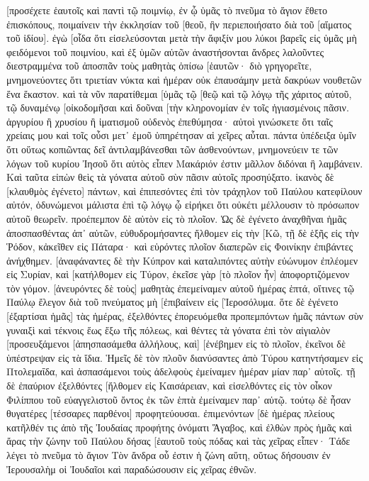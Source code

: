 [προσέχετε ἑαυτοῖς καὶ παντὶ τῷ ποιμνίῳ, ἐν ᾧ ὑμᾶς τὸ πνεῦμα τὸ ἅγιον ἔθετο ἐπισκόπους, ποιμαίνειν τὴν ἐκκλησίαν τοῦ [θεοῦ, ἣν περιεποιήσατο διὰ τοῦ [αἵματος τοῦ ἰδίου]. 
ἐγὼ [οἶδα ὅτι εἰσελεύσονται μετὰ τὴν ἄφιξίν μου λύκοι βαρεῖς εἰς ὑμᾶς μὴ φειδόμενοι τοῦ ποιμνίου, 
καὶ ἐξ ὑμῶν αὐτῶν ἀναστήσονται ἄνδρες λαλοῦντες διεστραμμένα τοῦ ἀποσπᾶν τοὺς μαθητὰς ὀπίσω [ἑαυτῶν· 
διὸ γρηγορεῖτε, μνημονεύοντες ὅτι τριετίαν νύκτα καὶ ἡμέραν οὐκ ἐπαυσάμην μετὰ δακρύων νουθετῶν ἕνα ἕκαστον. 
καὶ τὰ νῦν παρατίθεμαι [ὑμᾶς τῷ [θεῷ καὶ τῷ λόγῳ τῆς χάριτος αὐτοῦ, τῷ δυναμένῳ [οἰκοδομῆσαι καὶ δοῦναι [τὴν κληρονομίαν ἐν τοῖς ἡγιασμένοις πᾶσιν. 
ἀργυρίου ἢ χρυσίου ἢ ἱματισμοῦ οὐδενὸς ἐπεθύμησα· 
αὐτοὶ γινώσκετε ὅτι ταῖς χρείαις μου καὶ τοῖς οὖσι μετ᾽ ἐμοῦ ὑπηρέτησαν αἱ χεῖρες αὗται. 
πάντα ὑπέδειξα ὑμῖν ὅτι οὕτως κοπιῶντας δεῖ ἀντιλαμβάνεσθαι τῶν ἀσθενούντων, μνημονεύειν τε τῶν λόγων τοῦ κυρίου Ἰησοῦ ὅτι αὐτὸς εἶπεν Μακάριόν ἐστιν μᾶλλον διδόναι ἢ λαμβάνειν. 
Καὶ ταῦτα εἰπὼν θεὶς τὰ γόνατα αὐτοῦ σὺν πᾶσιν αὐτοῖς προσηύξατο. 
ἱκανὸς δὲ [κλαυθμὸς ἐγένετο] πάντων, καὶ ἐπιπεσόντες ἐπὶ τὸν τράχηλον τοῦ Παύλου κατεφίλουν αὐτόν, 
ὀδυνώμενοι μάλιστα ἐπὶ τῷ λόγῳ ᾧ εἰρήκει ὅτι οὐκέτι μέλλουσιν τὸ πρόσωπον αὐτοῦ θεωρεῖν. προέπεμπον δὲ αὐτὸν εἰς τὸ πλοῖον. 
Ὡς δὲ ἐγένετο ἀναχθῆναι ἡμᾶς ἀποσπασθέντας ἀπ᾽ αὐτῶν, εὐθυδρομήσαντες ἤλθομεν εἰς τὴν [Κῶ, τῇ δὲ ἑξῆς εἰς τὴν Ῥόδον, κἀκεῖθεν εἰς Πάταρα· 
καὶ εὑρόντες πλοῖον διαπερῶν εἰς Φοινίκην ἐπιβάντες ἀνήχθημεν. 
[ἀναφάναντες δὲ τὴν Κύπρον καὶ καταλιπόντες αὐτὴν εὐώνυμον ἐπλέομεν εἰς Συρίαν, καὶ [κατήλθομεν εἰς Τύρον, ἐκεῖσε γὰρ [τὸ πλοῖον ἦν] ἀποφορτιζόμενον τὸν γόμον. 
[ἀνευρόντες δὲ τοὺς] μαθητὰς ἐπεμείναμεν αὐτοῦ ἡμέρας ἑπτά, οἵτινες τῷ Παύλῳ ἔλεγον διὰ τοῦ πνεύματος μὴ [ἐπιβαίνειν εἰς [Ἱεροσόλυμα. 
ὅτε δὲ ἐγένετο [ἐξαρτίσαι ἡμᾶς] τὰς ἡμέρας, ἐξελθόντες ἐπορευόμεθα προπεμπόντων ἡμᾶς πάντων σὺν γυναιξὶ καὶ τέκνοις ἕως ἔξω τῆς πόλεως, καὶ θέντες τὰ γόνατα ἐπὶ τὸν αἰγιαλὸν [προσευξάμενοι 
[ἀπησπασάμεθα ἀλλήλους, καὶ] [ἐνέβημεν εἰς τὸ πλοῖον, ἐκεῖνοι δὲ ὑπέστρεψαν εἰς τὰ ἴδια. 
Ἡμεῖς δὲ τὸν πλοῦν διανύσαντες ἀπὸ Τύρου κατηντήσαμεν εἰς Πτολεμαΐδα, καὶ ἀσπασάμενοι τοὺς ἀδελφοὺς ἐμείναμεν ἡμέραν μίαν παρ᾽ αὐτοῖς. 
τῇ δὲ ἐπαύριον ἐξελθόντες [ἤλθομεν εἰς Καισάρειαν, καὶ εἰσελθόντες εἰς τὸν οἶκον Φιλίππου τοῦ εὐαγγελιστοῦ ὄντος ἐκ τῶν ἑπτὰ ἐμείναμεν παρ᾽ αὐτῷ. 
τούτῳ δὲ ἦσαν θυγατέρες [τέσσαρες παρθένοι] προφητεύουσαι. 
ἐπιμενόντων [δὲ ἡμέρας πλείους κατῆλθέν τις ἀπὸ τῆς Ἰουδαίας προφήτης ὀνόματι Ἅγαβος, 
καὶ ἐλθὼν πρὸς ἡμᾶς καὶ ἄρας τὴν ζώνην τοῦ Παύλου δήσας [ἑαυτοῦ τοὺς πόδας καὶ τὰς χεῖρας εἶπεν· Τάδε λέγει τὸ πνεῦμα τὸ ἅγιον Τὸν ἄνδρα οὗ ἐστιν ἡ ζώνη αὕτη, οὕτως δήσουσιν ἐν Ἰερουσαλὴμ οἱ Ἰουδαῖοι καὶ παραδώσουσιν εἰς χεῖρας ἐθνῶν. 
